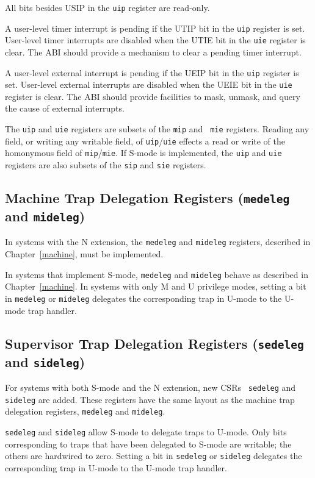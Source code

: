 All bits besides USIP in the {\tt uip} register are read-only.

A user-level timer interrupt is pending if the UTIP bit in the {\tt uip}
register is set.  User-level timer interrupts are disabled when the UTIE
bit in the {\tt uie} register is clear.  The ABI should provide a
mechanism to clear a pending timer interrupt.

A user-level external interrupt is pending if the UEIP bit in the
{\tt uip} register is set.  User-level external interrupts are disabled
when the UEIE bit in the {\tt uie} register is clear.  The ABI
should provide facilities to mask, unmask, and query the cause of external
interrupts.

The {\tt uip} and {\tt uie} registers are subsets of the {\tt mip} and {\tt
mie} registers.
Reading any field, or writing any writable field, of {\tt uip}/{\tt uie}
effects a read or write of the homonymous field of {\tt mip}/{\tt mie}.
If S-mode is implemented, the {\tt uip} and {\tt uie} registers are also
subsets of the {\tt sip} and {\tt sie} registers.

\subsection{Machine Trap Delegation Registers ({\tt medeleg} and {\tt mideleg})}

In systems with the N extension, the {\tt medeleg} and {\tt mideleg}
registers, described in Chapter~\ref{machine},  must be implemented.

In systems that implement S-mode, {\tt medeleg} and {\tt mideleg}
behave as described in Chapter~\ref{machine}.
In systems with only M and U privilege modes, setting a bit in {\tt medeleg}
or {\tt mideleg} delegates the corresponding trap in U-mode to the U-mode trap
handler.

\subsection{Supervisor Trap Delegation Registers ({\tt sedeleg} and {\tt sideleg})}

For systems with both S-mode and the N extension, new CSRs {\tt
sedeleg} and {\tt sideleg} are added.
These registers have the same layout as the machine trap delegation registers,
{\tt medeleg} and {\tt mideleg}.

{\tt sedeleg} and {\tt sideleg} allow S-mode to delegate traps to U-mode.
Only bits corresponding to traps that have been delegated to S-mode are
writable; the others are hardwired to zero.
Setting a bit in {\tt sedeleg} or {\tt sideleg} delegates the corresponding
trap in U-mode to the U-mode trap handler.

